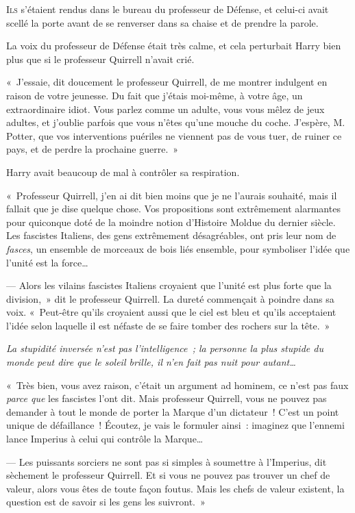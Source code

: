 
\lettrine{I}{ls} s'étaient rendus dans le bureau du professeur de Défense, et celui-ci avait scellé la porte avant de se renverser dans sa chaise et de prendre la parole.

La voix du professeur de Défense était très calme, et cela perturbait Harry bien plus que si le professeur Quirrell n'avait crié.

«~J'essaie, dit doucement le professeur Quirrell, de me montrer indulgent en raison de votre jeunesse. Du fait que j'étais moi-même, à votre âge, un extraordinaire idiot. Vous parlez comme un adulte, vous vous mêlez de jeux adultes, et j'oublie parfois que vous n'êtes qu'une mouche du coche. J'espère, M. Potter, que vos interventions puériles ne viennent pas de vous tuer, de ruiner ce pays, et de perdre la prochaine guerre.~»

Harry avait beaucoup de mal à contrôler sa respiration.

«~Professeur Quirrell, j'en ai dit bien moins que je ne l'aurais souhaité, mais il fallait que je dise quelque chose. Vos propositions sont extrêmement alarmantes pour quiconque doté de la moindre notion d'Histoire Moldue du dernier siècle. Les fascistes Italiens, des gens extrêmement désagréables, ont pris leur nom de \emph{fasces}, un ensemble de morceaux de bois liés ensemble, pour symboliser l'idée que l'unité est la force…

--- Alors les vilains fascistes Italiens croyaient que l'unité est plus forte que la division,~» dit le professeur Quirrell. La dureté commençait à poindre dans sa voix. «~Peut-être qu'ils croyaient aussi que le ciel est bleu et qu'ils acceptaient l'idée selon laquelle il est néfaste de se faire tomber des rochers sur la tête.~»

\emph{La stupidité inversée n'est pas l'intelligence~; la personne la plus stupide du monde peut dire que le soleil brille, il n'en fait pas nuit pour autant…}

«~Très bien, vous avez raison, c'était un argument ad hominem, ce n'est pas faux \emph{parce que} les fascistes l'ont dit. Mais professeur Quirrell, vous ne pouvez pas demander à tout le monde de porter la Marque d'un dictateur~! C'est un point unique de défaillance~! Écoutez, je vais le formuler ainsi~: imaginez que l'ennemi lance Imperius à celui qui contrôle la Marque…

--- Les puissants sorciers ne sont pas si simples à soumettre à l'Imperius, dit sèchement le professeur Quirrell. Et si vous ne pouvez pas trouver un chef de valeur, alors vous êtes de toute façon foutus. Mais les chefs de valeur existent, la question est de savoir si les gens les suivront.~»

